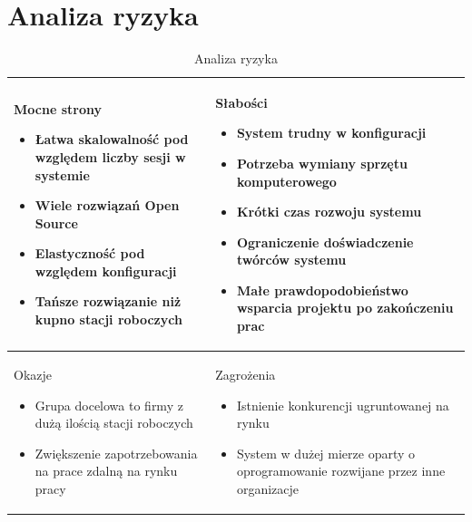 \documentclass[../praca-dyplomowa.tex]{subfiles}
\begin{document}
\section{Analiza ryzyka}

\begin{table}[H]
    \caption[Opis skrócony]{Analiza ryzyka}
    \label{risk-analysis}
    \centering
    \begin{tabular}{| p{} | p{} |}
        \hline
        Mocne strony
        \begin{itemize}
            \item Łatwa skalowalność pod względem liczby sesji w systemie
            \item Wiele rozwiązań Open Source
            \item Elastyczność pod względem konfiguracji
            \item Tańsze rozwiązanie niż kupno stacji roboczych
        \end{itemize}
         &
        Słabości
        \begin{itemize}
            \item System trudny w konfiguracji
            \item Potrzeba wymiany sprzętu komputerowego
            \item Krótki czas rozwoju systemu
            \item Ograniczenie doświadczenie twórców systemu
            \item Małe prawdopodobieństwo wsparcia projektu po zakończeniu prac
        \end{itemize}
        \\ \hline

        Okazje
        \begin{itemize}
            \item Grupa docelowa to firmy z dużą ilością stacji roboczych
            \item Zwiększenie zapotrzebowania na prace zdalną na rynku pracy
        \end{itemize}
         &

        Zagrożenia
        \begin{itemize}
            \item Istnienie konkurencji ugruntowanej na rynku
            \item System w dużej mierze oparty o oprogramowanie rozwijane przez inne organizacje
        \end{itemize}
        \\ \hline
    \end{tabular}
\end{table}
\end{document}
